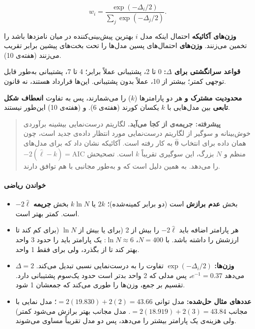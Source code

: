 \[
w_i = \frac{\exp(-\Delta_i/2)}{\sum_j \exp(-\Delta_j/2)}.
\]

\textbf{وزن‌های آکائیکه} احتمال اینکه مدل \(i\) بهترین پیش‌بینی‌کننده در
میان نامزدها باشد را تخمین می‌زنند. \textbf{وزن‌های } احتمال‌های
پسین مدل‌ها را تحت بخت‌های پیشین برابر تقریب می‌زنند (هفته‌ی 10).

\textbf{قواعد سرانگشتی برای \(\Delta\):} 0 تا 2، پشتیبانی عملاً برابر؛ 4
تا 7، پشتیبانی به‌طور قابل توجهی کمتر؛ بیشتر از 10، عملاً بدون پشتیبانی.
این‌ها قرارداد هستند، نه قانون.

\textbf{محدودیت مشترک  و } هر دو پارامترها (\(k\)) را
می‌شمارند، پس به تفاوت \textbf{انعطاف شکل تابعی} بین مدل‌هایی با \(k\)
یکسان کورند (هفته‌ی 6).  و  (هفته‌ی
10) این‌طور نیستند.

\begin{quote}
\textbf{پیشرفته: جریمه‌ی  از کجا می‌آید.} لگاریتم درست‌نمایی بیشینه
برآوردی خوش‌بینانه و سوگیر از لگاریتم درست‌نمایی مورد انتظار داده‌ی جدید
است، چون همان داده برای انتخاب \(\hat{\boldsymbol\theta}\) به کار رفته
است. آکائیکه نشان داد که برای مدل‌های منظم و \(N\) بزرگ، این سوگیری
تقریباً \(k\) است. تصحیحش \(-2(\hat\ell - k) = \mathrm{AIC}\) را می‌دهد.
به همین دلیل است که  و  به‌طور مجانبی با هم توافق
دارند.
\end{quote}

\paragraph{خواندن ریاضی}

\begin{itemize}
\tightlist
\item
  \(-2\hat\ell\) بخش \textbf{عدم برازش} است (دو برابر 
  کمینه‌شده)؛ \(2k\) یا \(k\ln N\) بخش \textbf{جریمه} است. 
  کمتر بهتر است.
\item
  هر پارامتر اضافه باید \(-2\hat\ell\) را بیش از 2 (برای  یا
  بیش از \(\ln N\) (برای  کم کند تا ارزشش را داشته باشد. با
  \(N = 400\)، \(\ln N \approx 6\): یک پارامتر باید  را حدود 3
  واحد بهتر کند تا از  بگذرد، ولی برای  فقط 1 واحد.
\item
  \textbf{وزن‌ها:} \(\exp(-\Delta_i/2)\) تفاوت  را به درست‌نمایی
  نسبی تبدیل می‌کند. \(\Delta = 2\) می‌دهد \(e^{-1} = 0.37\)، پس مدلی که 2
  واحد  بدتر است حدود یک‌سوم پشتیبانی دارد. تقسیم بر جمع، وزن‌ها
  را طوری می‌کند که جمعشان 1 شود.
\item
  \textbf{عددهای مثال حل‌شده:}  مدل توانی
  \(= 2(19.830) + 2(2) = 43.66\)؛ مدل نمایی با مجانب
  \(= 2(18.919) + 2(3) = 43.84\). مدل مجانب بهتر برازش می‌شود 
  کمتر) ولی هزینه‌ی یک پارامتر بیشتر را می‌دهد، پس دو مدل تقریباً مساوی
  می‌شوند.
\end{itemize}

